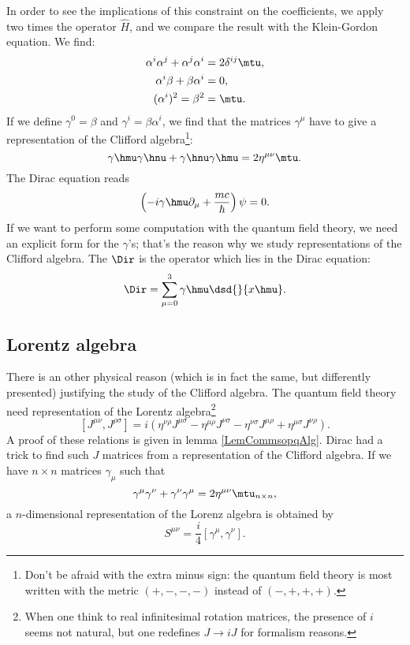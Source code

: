 In order to see the implications of this constraint on the coefficients, we apply two times the operator $\hat{H}$, and we compare the result with the Klein-Gordon equation. We find:
\begin{subequations}
\begin{align}
 \alpha^i\alpha^j+\alpha^j\alpha^i&=2\delta^{ij}\mtu,\\
 \alpha^i\beta+\beta\alpha^i&=0,\\
 (\alpha^i)^2=\beta^2&=\mtu.
\end{align}
\end{subequations}
%
If we define $\gamma^0=\beta$ and $\gamma^i=\beta\alpha^i$, we find that the matrices $\gamma^{\mu}$ have to give a representation of the Clifford algebra\footnote{Don't be afraid with the extra minus sign: the quantum field theory is most written with the metric $(+,-,-,-)$ instead of $(-,+,+,+)$.}:
\begin{equation}\label{cliffphys}
	\gamma\hmu\gamma\hnu+\gamma\hnu\gamma\hmu=2\eta^{\mu\nu}\mtu.
\end{equation}
The Dirac equation reads
\[
\left(-i\gamma\hmu\partial_{\mu}+\frac{mc}{\hbar}\right)\psi=0.
\]
If we want to perform some computation with the quantum field theory, we need an explicit form for the $\gamma$'s; that's the reason why we study representations of the Clifford algebra. The  $\Dir$ is the operator which lies in the Dirac equation:
\begin{equation}
 \label{dirflat}\Dir=\sum_{\mu=0}^3\gamma\hmu\dsd{}{x\hmu}.
\end{equation}

\subsection{Lorentz algebra}

There is an other physical reason (which is in fact the same, but differently presented) justifying the study of the Clifford algebra. The quantum field theory need representation of the Lorentz algebra\footnote{When one think to real infinitesimal rotation matrices, the presence of $i$ seems not natural, but one redefines $J\to iJ$ for formalism reasons.}
\[
 [J^{\mu\nu},J^{\rho\sigma}]=i(\eta^{\nu\rho}J^{\mu\sigma}-\eta^{\mu\rho}J^{\nu\sigma}
 -\eta^{\nu\sigma}J^{\mu\rho}+\eta^{\mu\sigma}J^{\nu\rho}).
\]
A proof of these relations is given in lemma \ref{LemCommsopqAlg}. Dirac had a trick to find such $J$ matrices from a representation of the Clifford algebra. If we have $n\times n$ matrices $\gamma_{\mu}$ such that
\[
	\gamma^{\mu}\gamma^{\nu}+\gamma^{\nu}\gamma^{\mu}=2\eta^{\mu\nu}\mtu_{n\times n},
\]
a $n$-dimensional representation of the Lorenz algebra is obtained by
\[
	S^{\mu\nu}=\frac{i}{4}\left[\gamma^{\mu},\gamma^{\nu}\right].
\]

